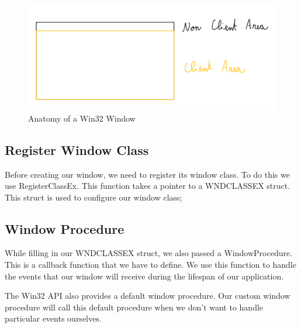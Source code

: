 \begin{figure}[ht]
    \centering
    \includegraphics[scale=0.30]{images/ChInitializingVulkan/Win32Window.png}
    \caption{Anatomy of a Win32 Window}
    \label{fig::Win32Window}
\end{figure}

\begin{minipage}{\linewidth}{\noindent}
    
\end{minipage}

\subsection{Register Window Class}

Before creating our window, we need to register its window class.
To do this we use RegisterClassEx.
This function takes a pointer to a WNDCLASSEX struct.
This struct is used to configure our window class;

\begin{minipage}{\linewidth}{\noindent}
    
\end{minipage}

\subsection{Window Procedure}

While filling in our WNDCLASSEX struct, we also passed a WindowProcedure.
This is a callback function that we have to define.
We use this function to handle the events that our window will receive during
the lifespan of our application.

The Win32 API also provides a default window procedure.
Our custom window procedure will call this default procedure when we don't want
to handle particular events ourselves.

